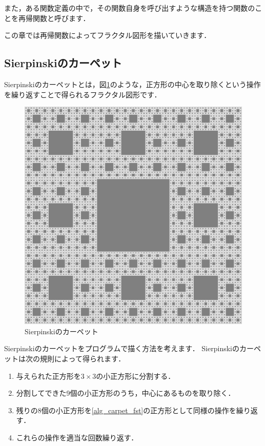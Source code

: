 \documentclass[dvipdfmx]{jsarticle}
\theoremstyle{definition}
\begin{document}
また，ある関数定義の中で，その関数自身を呼び出すような構造を持つ関数のことを再帰関数と呼びます．

この章では再帰関数によってフラクタル図形を描いていきます．


\subsection{Sierpinskiのカーペット}
\label{subsec_carpet}

Sierpinskiのカーペットとは，図\ref{pic_carpet}のような，正方形の中心を取り除くという操作を繰り返すことで得られるフラクタル図形です．

\begin{figure}[ht]
\begin{center}
    \includegraphics[scale=0.15]{figure/carpet.png}
\end{center}
\caption{Sierpinskiのカーペット}
\label{pic_carpet}
\end{figure}

Sierpinskiのカーペットをプログラムで描く方法を考えます．
Sierpinskiのカーペットは次の規則によって得られます．
\begin{enumerate}
    \item 与えられた正方形を$3 \times 3$の小正方形に分割する． \label{alg_carpet_fst}
    \item 分割してできた9個の小正方形のうち，中心にあるものを取り除く．
    \item 残りの8個の小正方形を\ref{alg_carpet_fst}の正方形として同様の操作を繰り返す．
    \item これらの操作を適当な回数繰り返す．
\end{enumerate}
\end{document}
